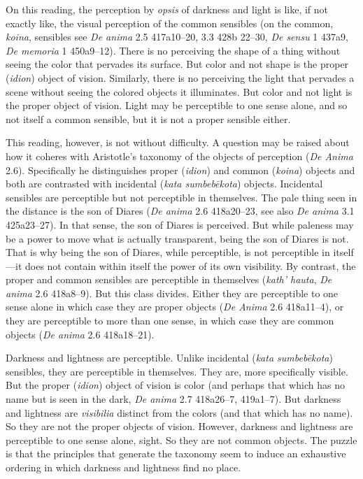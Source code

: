 On this reading, the perception by \emph{opsis} of darkness and light is like, if not exactly like, the visual perception of the common sensibles (on the common, \emph{koina}, sensibles see \emph{De anima} 2.5 417a10–20, 3.3 428b 22–30, \emph{De sensu} 1 437a9, \emph{De memoria} 1 450a9–12). There is no perceiving the shape of a thing without seeing the color that pervades its surface. But color and not shape is the proper (\emph{idion}) object of vision. Similarly, there is no perceiving the light that pervades a scene without seeing the colored objects it illuminates. But color and not light is the proper object of vision. Light may be perceptible to one sense alone, and so not itself a common sensible, but it is not a proper sensible either.


This reading, however, is not without difficulty. A question may be raised about how it coheres with Aristotle's taxonomy of the objects of perception (\emph{De Anima} 2.6). Specifically he distinguishes proper (\emph{idion}) and common (\emph{koina}) objects and both are contrasted with incidental (\emph{kata sumbebēkota}) objects. Incidental sensibles are perceptible but not perceptible in themselves. The pale thing seen in the distance is the son of Diares (\emph{De anima} 2.6 418a20–23, see also \emph{De anima} 3.1 425a23–27). In that sense, the son of Diares is perceived. But while paleness may be a power to move what is actually transparent, being the son of Diares is not. That is why being the son of Diares, while perceptible, is not perceptible in itself—it does not contain within itself the power of its own visibility. By contrast, the proper and common sensibles are perceptible in themselves (\emph{kath' hauta}, \emph{De anima} 2.6 418a8–9). But this class divides. Either they are perceptible to one sense alone in which case they are proper objects (\emph{De Anima} 2.6 418a11–4), or they are perceptible to more than one sense, in which case they are common objects (\emph{De anima} 2.6 418a18–21).

Darkness and lightness are perceptible. Unlike incidental (\emph{kata sumbebēkota}) sensibles, they are perceptible in themselves. They are, more specifically visible. But the proper (\emph{idion}) object of vision is color (and perhaps that which has no name but is seen in the dark, \emph{De anima} 2.7 418a26–7, 419a1–7). But darkness and lightness are \emph{visibilia} distinct from the colors (and that which has no name). So they are not the proper objects of vision. However, darkness and lightness are perceptible to one sense alone, sight. So they are not common objects. The puzzle is that the principles that generate the taxonomy seem to induce an exhaustive ordering in which darkness and lightness find no place. 

